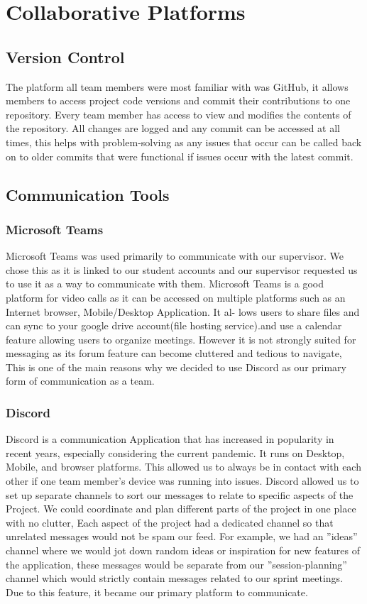 \section{Collaborative Platforms}
\subsection{Version Control}
The platform all team members were most familiar with was GitHub, it allows members to access project code versions and commit their contributions to one repository. Every team member has access to view and modifies the contents of the repository. All changes are logged and any commit can be accessed at all times, this helps with problem-solving as any issues that occur can be called back on to older commits that were functional if issues occur with the latest commit.

\subsection{Communication Tools}
\subsubsection{Microsoft Teams}
Microsoft Teams was used primarily to communicate with our supervisor. We chose this as it is linked to our student accounts and our supervisor requested us to use it as a way to communicate with them.
\newline 
Microsoft Teams is a good platform for video calls as it can be accessed on multiple platforms such as an Internet browser, Mobile/Desktop Application. It al- lows users to share files and can sync to your google drive account(file hosting service).and use a calendar feature allowing users to organize meetings.
\newline
However it is not strongly suited for messaging as its forum feature can become cluttered and tedious to navigate, This is one of the main reasons why we decided to use Discord as our primary form of communication as a team.

\subsubsection{Discord} 
Discord is a communication Application that has increased in popularity in recent years, especially considering the current pandemic. It runs on Desktop, Mobile, and browser platforms. This allowed us to always be in contact with each other if one team member's device was running into issues.
\newline
Discord allowed us to set up separate channels to sort our messages to relate to specific aspects of the Project. We could coordinate and plan different parts of the project in one place with no clutter, Each aspect of the project had a dedicated channel so that unrelated messages would not be spam our feed. For example, we had an ”ideas” channel where we would jot down random ideas or inspiration for new features of the application, these messages would be separate from our ”session-planning” channel which would strictly contain messages related to our sprint meetings. Due to this feature, it became our primary platform to communicate.
\newline
